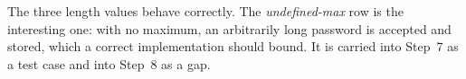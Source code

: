 \documentclass[11pt,a4paper]{article}
\begin{document}
\noindent The three length values behave correctly. The \emph{undefined-max} row is the
interesting one: with no maximum, an arbitrarily long password is accepted and stored,
which a correct implementation should bound. It is carried into Step~7 as a test case and
into Step~8 as a gap.

\end{document}
